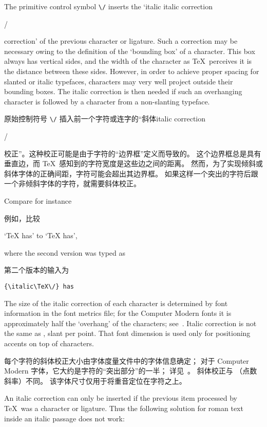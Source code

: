 The primitive control symbol \verb-\/- inserts the `italic
\term italic correction\par\cstoidx /\par
correction' of the previous character or ligature.
Such a correction may be necessary owing to the definition
of the `bounding box' of a character. This box always
has vertical sides, and the width of the character as \TeX\
perceives it is the distance between these sides.
However, in order to achieve proper spacing  for slanted or
italic typefaces, characters may very well project outside their
bounding boxes. The italic correction is then needed if
such an overhanging character is followed by a 
character from a non-slanting typeface.
\awp

原始控制符号 \verb-\/- 插入前一个字符或连字的“斜体\term italic correction\par\cstoidx /\par
校正”。这种校正可能是由于字符的“边界框”定义而导致的。
这个边界框总是具有垂直边，而 \TeX\ 感知到的字符宽度是这些边之间的距离。
然而，为了实现倾斜或斜体字体的正确间距，字符可能会超出其边界框。
如果这样一个突出的字符后跟一个非倾斜字体的字符，就需要斜体校正。

Compare for instance

例如，比较
\begin{Disp} `{\italic\TeX} has'
to `{\italic\TeX\/} has',
\end{Disp} where the second version was typed as

第二个版本的输入为
\begin{verbatim}
{\italic\TeX\/} has
\end{verbatim}

The size of the italic correction of each character
is determined by font information
in the font metrics file; for the Computer Modern fonts it is
approximately half the `overhang' of the characters;
see~\cite{K:partE}.
Italic correction is not the same as , slant
per point. That font dimension is used only for positioning
accents on top of characters.

每个字符的斜体校正大小由字体度量文件中的字体信息确定；
对于 Computer Modern 字体，它大约是字符的“突出部分”的一半；
详见~\cite{K:partE}。
斜体校正与 （点数斜率）不同。
该字体尺寸仅用于将重音定位在字符之上。

An italic correction can only be inserted if the previous item
processed 
by \TeX\ was a character or ligature. Thus the
following solution for roman text inside an italic passage
does not work:

